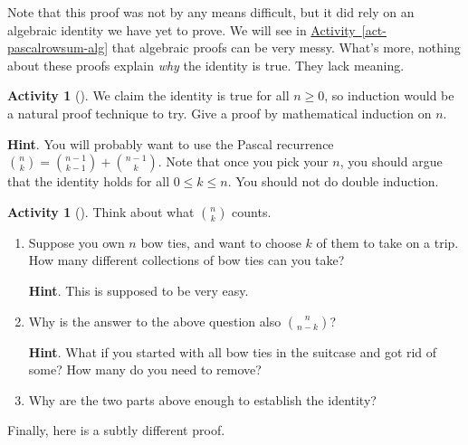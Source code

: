 \documentclass[10pt,]{book}
\theoremstyle{plain}
\theoremstyle{definition}
\theoremstyle{definition}
\theoremstyle{definition}
\newtheorem{activity}[project]{Activity}
\theoremstyle{definition}
\numberwithin{equation}{chapter}
\begin{document}
\hypertarget{p-460}{}%
Note that this proof was not by any means difficult, but it did rely on an algebraic identity we have yet to prove.  We will see in \hyperref[act-pascalrowsum-alg]{Activity~\ref{act-pascalrowsum-alg}} that algebraic proofs can be very messy.  What's more, nothing about these proofs explain \emph{why} the identity is true.  They lack meaning.%
\begin{activity}[]\label{activity-16}
\hypertarget{p-461}{}%
We claim the identity is true for all \(n \ge 0\), so induction would be a natural proof technique to try.  Give a proof by mathematical induction on \(n\).%
\par\smallskip%
\noindent\textbf{Hint}.\hypertarget{hint-5}{}\quad%
\hypertarget{p-462}{}%
You will probably want to use the Pascal recurrence \(\binom{n}{k} = \binom{n-1}{k-1} + \binom{n-1}{k}\).  Note that once you pick your \(n\), you should argue that the identity holds for all \(0 \le k \le n\).  You should not do double induction.%
\end{activity}
\begin{activity}[]\label{act-pascalsym-dc}
\hypertarget{p-463}{}%
Think about what \(\binom{n}{k}\) counts.%
\begin{enumerate}[font=\bfseries,label=(\alph*),ref=\alph*]
\item\label{task-33} \hypertarget{p-464}{}%
Suppose you own \(n\) bow ties, and want to choose \(k\) of them to take on a trip.  How many different collections of bow ties can you take?%
\par\smallskip%
\noindent\textbf{Hint}.\hypertarget{hint-6}{}\quad%
\hypertarget{p-465}{}%
This is supposed to be very easy.%
\item\label{task-34} \hypertarget{p-466}{}%
Why is the answer to the above question also \(\binom{n}{n-k}\)?%
\par\smallskip%
\noindent\textbf{Hint}.\hypertarget{hint-7}{}\quad%
\hypertarget{p-467}{}%
What if you started with all bow ties in the suitcase and got rid of some?  How many do you need to remove?%
\item\label{task-35} \hypertarget{p-468}{}%
Why are the two parts above enough to establish the identity?%
\end{enumerate}
\end{activity}
\hypertarget{p-469}{}%
Finally, here is a subtly different proof.%
\end{document}
